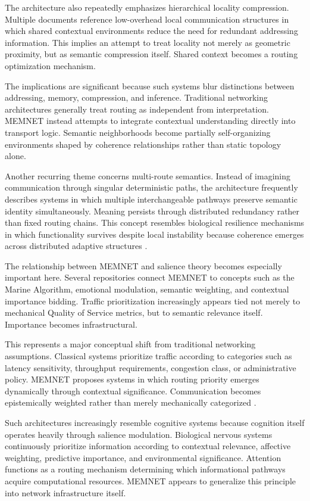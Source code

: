 \documentclass[11pt,a4paper]{article}
\begin{document}
The architecture also repeatedly emphasizes hierarchical locality compression. Multiple documents reference low-overhead local communication structures in which shared contextual environments reduce the need for redundant addressing information. This implies an attempt to treat locality not merely as geometric proximity, but as semantic compression itself. Shared context becomes a routing optimization mechanism.

The implications are significant because such systems blur distinctions between addressing, memory, compression, and inference. Traditional networking architectures generally treat routing as independent from interpretation. MEMNET instead attempts to integrate contextual understanding directly into transport logic. Semantic neighborhoods become partially self-organizing environments shaped by coherence relationships rather than static topology alone.

Another recurring theme concerns multi-route semantics. Instead of imagining communication through singular deterministic paths, the architecture frequently describes systems in which multiple interchangeable pathways preserve semantic identity simultaneously. Meaning persists through distributed redundancy rather than fixed routing chains. This concept resembles biological resilience mechanisms in which functionality survives despite local instability because coherence emerges across distributed adaptive structures \cite{wiener1948}.

The relationship between MEMNET and salience theory becomes especially important here. Several repositories connect MEMNET to concepts such as the Marine Algorithm, emotional modulation, semantic weighting, and contextual importance bidding. Traffic prioritization increasingly appears tied not merely to mechanical Quality of Service metrics, but to semantic relevance itself. Importance becomes infrastructural.

This represents a major conceptual shift from traditional networking assumptions. Classical systems prioritize traffic according to categories such as latency sensitivity, throughput requirements, congestion class, or administrative policy. MEMNET proposes systems in which routing priority emerges dynamically through contextual significance. Communication becomes epistemically weighted rather than merely mechanically categorized \cite{strinati2021}.

Such architectures increasingly resemble cognitive systems because cognition itself operates heavily through salience modulation. Biological nervous systems continuously prioritize information according to contextual relevance, affective weighting, predictive importance, and environmental significance. Attention functions as a routing mechanism determining which informational pathways acquire computational resources. MEMNET appears to generalize this principle into network infrastructure itself.
\end{document}
